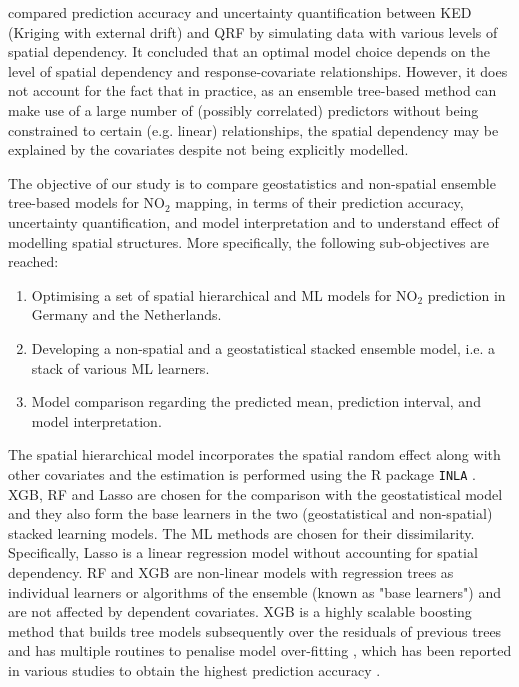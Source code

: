 \documentclass{article}
\begin{document}
\cite{fouedjio2019exploring} compared prediction accuracy and uncertainty quantification between KED (Kriging with external drift) and QRF by simulating data with various levels of spatial dependency. It concluded that an optimal model choice depends on the level of spatial dependency and response-covariate relationships. However, it does not account for the fact that in practice, as an ensemble tree-based method can make use of a large number of (possibly correlated) predictors without being constrained to certain (e.g. linear) relationships, the spatial dependency may be explained by the covariates despite not being explicitly modelled. 

The objective of our study is to compare geostatistics and non-spatial ensemble tree-based models for NO$_2$ mapping, in terms of their prediction accuracy, uncertainty quantification, and model interpretation and to understand effect of modelling spatial structures. More specifically, the following sub-objectives are reached:

\begin{enumerate}
    \item Optimising a set of  spatial hierarchical and ML models for NO$_2$ prediction in Germany and the Netherlands.
    
    \item Developing a non-spatial and a geostatistical stacked ensemble model, i.e. a stack of various ML learners.
    \item Model comparison regarding the predicted mean, prediction interval, and model interpretation.  
\end{enumerate}

 
 
The spatial hierarchical model incorporates the spatial random effect along with other covariates and the estimation is performed using the R package \texttt{INLA} \citep{rue2009approximate,martins2013bayesian}. XGB, RF and Lasso are chosen for the comparison with the geostatistical model and they also form the base learners in the two (geostatistical and non-spatial) stacked learning models. The ML methods are chosen for their dissimilarity. Specifically, Lasso is a linear regression model without accounting for spatial dependency. RF and XGB are non-linear models with regression trees as individual learners or algorithms of the ensemble (known as "base learners") and are not affected by dependent covariates. XGB is a highly scalable boosting method that builds tree models subsequently over the residuals of previous trees and has multiple routines to penalise model over-fitting \citep{xgboost}, which has been reported in various studies to obtain the highest prediction accuracy \cite{luglobal}. 
\end{document}
